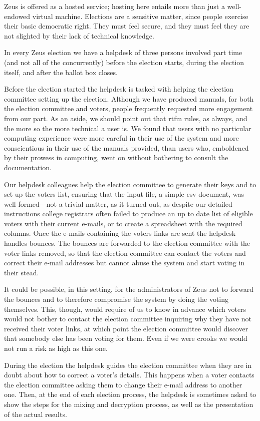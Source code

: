 \documentclass[letterpaper,10pt]{article}
\begin{document}
Zeus is offered as a hosted service; hosting here entails more than
just a well-endowed virtual machine. Elections are a sensitive matter,
since people exercise their basic democratic right. They must feel
secure, and they must feel they are not slighted by their lack of
technical knowledge.

In every Zeus election we have a helpdesk of three persons involved
part time (and not all of the concurrently) before the election
starts, during the election itself, and after the ballot box closes.

Before the election started the helpdesk is tasked with helping the
election committee setting up the election. Although we have produced
manuals, for both the election committee and voters, people frequently
requested more engagement from our part. As an aside, we should point
out that {\sc rtfm} rules, as always, and the more so the more
technical a user is. We found that users with no particular computing
experience were more careful in their use of the system and more
conscientious in their use of the manuals provided, than users who,
emboldened by their prowess in computing, went on without bothering to
consult the documentation.

Our helpdesk colleagues help the election committee to generate
their keys and to set up the voters list, ensuring that the input
file, a simple {\sc csv} document, was well formed---not a trivial
matter, as it turned out, as despite our detailed instructions college
registrars often failed to produce an up to date list of eligible
voters with their current e-mails, or to create a spreadsheet with the
required columns. Once the e-mails containing the
voters links are sent the helpdesk handles bounces. The bounces
are forwarded to the election committee with the voter links removed,
so that the election committee can contact the voters and correct
their e-mail addresses but cannot abuse the system and start voting in
their stead. 

It could be possible, in this setting, for the administrators of Zeus
not to forward the bounces and to therefore compromise the system by
doing the voting themselves. This, though, would require of us to know
in advance which voters would not bother to contact the election
committee inquiring why they have not received their voter links, at
which point the election committee would discover that somebody else
has been voting for them. Even if we were crooks we would not run a
risk as high as this one.

During the election the helpdesk guides the election committee when
they are in doubt about how to correct a voter's details. This happens
when a voter contacts the election committee asking them to change
their e-mail address to another one. Then, at the end of each election
process, the helpdesk is sometimes asked to show the steps for the
mixing and decryption process, as well as the presentation of the
actual results.
\end{document}
